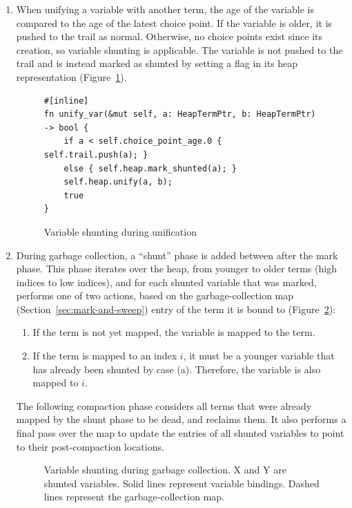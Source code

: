 \begin{enumerate}
\item When unifying a variable with another term, the age of the variable is compared to the age of the latest choice point. If the variable is older, it is pushed to the trail as normal. Otherwise, no choice points exist since its creation, so variable shunting is applicable. The variable is not pushed to the trail and is instead marked as shunted by setting a flag in its heap representation (Figure~\ref{fig:unify-var}).

\begin{figure}[H]
\centering
\begin{verbatim}
#[inline]
fn unify_var(&mut self, a: HeapTermPtr, b: HeapTermPtr) -> bool {
    if a < self.choice_point_age.0 { self.trail.push(a); }
    else { self.heap.mark_shunted(a); }
    self.heap.unify(a, b);
    true
}
\end{verbatim}
\caption{Variable shunting during unification}
\label{fig:unify-var}
\end{figure}

\item During garbage collection, a ``shunt'' phase is added between after the mark phase. This phase iterates over the heap, from younger to older terms (high indices to low indices), and for each shunted variable that was marked, performs one of two actions, based on the garbage-collection map (Section~\ref{sec:mark-and-sweep}) entry of the term it is bound to (Figure~\ref{fig:shunt-cases}):
\begin{enumerate}
\item If the term is not yet mapped, the variable is mapped to the term.
\item If the term is mapped to an index $i$, it must be a younger variable that has already been shunted by case (a). Therefore, the variable is also mapped to $i$.
\end{enumerate}

The following compaction phase considers all terms that were already mapped by the shunt phase to be dead, and reclaims them. It also performs a final pass over the map to update the entries of all shunted variables to point to their post-compaction locations.

\begin{figure}[H]
\centering
{}
\caption{Variable shunting during garbage collection. X and Y are shunted variables. Solid lines represent variable bindings. Dashed lines represent the garbage-collection map.}
\label{fig:shunt-cases}
\end{figure}

\end{enumerate}

